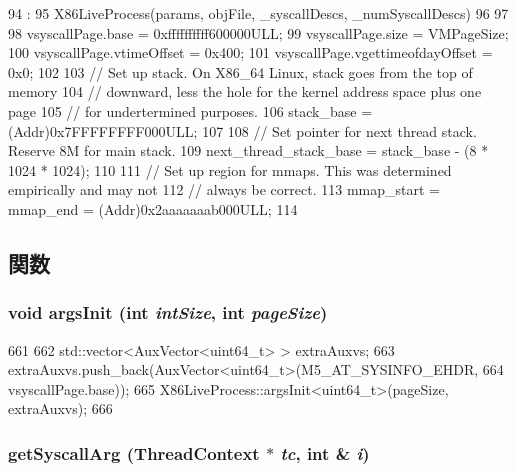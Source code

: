 \begin{DoxyCode}
94                               :
95     X86LiveProcess(params, objFile, _syscallDescs, _numSyscallDescs)
96 {
97 
98     vsyscallPage.base = 0xffffffffff600000ULL;
99     vsyscallPage.size = VMPageSize;
100     vsyscallPage.vtimeOffset = 0x400;
101     vsyscallPage.vgettimeofdayOffset = 0x0;
102 
103     // Set up stack. On X86_64 Linux, stack goes from the top of memory
104     // downward, less the hole for the kernel address space plus one page
105     // for undertermined purposes.
106     stack_base = (Addr)0x7FFFFFFFF000ULL;
107 
108     // Set pointer for next thread stack.  Reserve 8M for main stack.
109     next_thread_stack_base = stack_base - (8 * 1024 * 1024);
110 
111     // Set up region for mmaps. This was determined empirically and may not
112     // always be correct.
113     mmap_start = mmap_end = (Addr)0x2aaaaaaab000ULL;
114 }

\end{DoxyCode}


\subsection{関数}
\hypertarget{classX86ISA_1_1X86__64LiveProcess_a60e5314ffeede1e51c6bcb2cf606ca92}{
\subsubsection[{argsInit}]{\setlength{\rightskip}{0pt plus 5cm}void argsInit (int {\em intSize}, \/  int {\em pageSize})}}
\label{classX86ISA_1_1X86__64LiveProcess_a60e5314ffeede1e51c6bcb2cf606ca92}



\begin{DoxyCode}
661 {
662     std::vector<AuxVector<uint64_t> > extraAuxvs;
663     extraAuxvs.push_back(AuxVector<uint64_t>(M5_AT_SYSINFO_EHDR,
664                 vsyscallPage.base));
665     X86LiveProcess::argsInit<uint64_t>(pageSize, extraAuxvs);
666 }
\end{DoxyCode}
\hypertarget{classX86ISA_1_1X86__64LiveProcess_a6f33c62983b3e68106d1cdb43b9fc09c}{
\subsubsection[{getSyscallArg}]{ getSyscallArg ({\bf ThreadContext} $\ast$ {\em tc}, \/  int \& {\em i})}}
\label{classX86ISA_1_1X86__64LiveProcess_a6f33c62983b3e68106d1cdb43b9fc09c}


